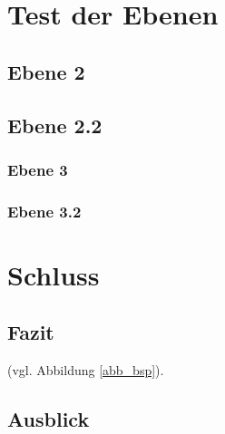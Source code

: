 \section{Test der Ebenen}
\subsection{Ebene 2}
\blindtext
\subsection{Ebene 2.2}
\blindtext
\subsubsection{Ebene 3}
\blindtext
\subsubsection{Ebene 3.2}
\blindtext
{}
\blindtext
{}
\blindtext

\section{Schluss}
\subsection{Fazit}
\blindtext (vgl. Abbildung \ref{abb_bsp}).

\subsection{Ausblick}
\blindtext
